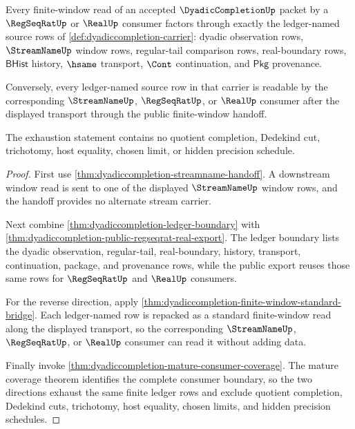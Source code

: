\begin{theorem}
\label{thm:dyadiccompletion-window-ledger-source-exhaustion}
Every finite-window read of an accepted $\DyadicCompletionUp$ packet by a
$\RegSeqRatUp$ or $\RealUp$ consumer factors through exactly the ledger-named
source rows of \autoref{def:dyadiccompletion-carrier}: dyadic observation
rows, $\StreamNameUp$ window rows, regular-tail comparison rows,
real-boundary rows, $\mathsf{BHist}$ history, $\hsame$ transport,
$\Cont$ continuation, and $\mathsf{Pkg}$ provenance.

Conversely, every ledger-named source row in that carrier is readable by the
corresponding $\StreamNameUp$, $\RegSeqRatUp$, or $\RealUp$ consumer after the
displayed transport through the public finite-window handoff.

The exhaustion statement contains no quotient completion, Dedekind cut,
trichotomy, host equality, chosen limit, or hidden precision schedule.
\end{theorem}
\begin{proof}
First use \autoref{thm:dyadiccompletion-streamname-handoff}. A downstream
window read is sent to one of the displayed $\StreamNameUp$ window rows, and
the handoff provides no alternate stream carrier.

Next combine \autoref{thm:dyadiccompletion-ledger-boundary} with
\autoref{thm:dyadiccompletion-public-regseqrat-real-export}. The ledger
boundary lists the dyadic observation, regular-tail, real-boundary, history,
transport, continuation, package, and provenance rows, while the public export
reuses those same rows for $\RegSeqRatUp$ and $\RealUp$ consumers.

For the reverse direction, apply
\autoref{thm:dyadiccompletion-finite-window-standard-bridge}. Each
ledger-named row is repacked as a standard finite-window read along the
displayed transport, so the corresponding $\StreamNameUp$, $\RegSeqRatUp$, or
$\RealUp$ consumer can read it without adding data.

Finally invoke \autoref{thm:dyadiccompletion-mature-consumer-coverage}. The
mature coverage theorem identifies the complete consumer boundary, so the two
directions exhaust the same finite ledger rows and exclude quotient completion,
Dedekind cuts, trichotomy, host equality, chosen limits, and hidden precision
schedules.
\end{proof}

